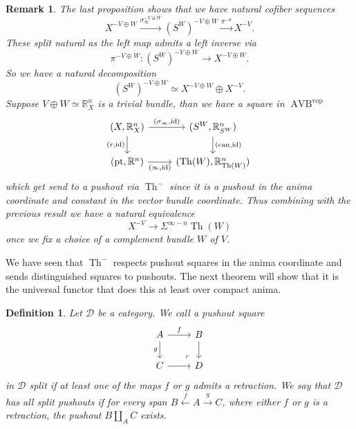 \documentclass{article}
\newcommand{\xto}{\xrightarrow}
\newcommand{\xot}{\xleftarrow}
\newcommand{\R}{\mathbb{R}} %
\newcommand{\cD}{\mathcal{D}}
\newcommand{\pt}{\mathrm{pt}}
\newcommand{\vop}{\mathrm{vop}}
\newcommand{\id}{\mathrm{id}}
\DeclareMathOperator{\AVB}{AVB}
\DeclareMathOperator{\Th}{Th}
\newtheorem{definition}{Definition}
\newtheorem{remark}{Remark}
\begin{document}
\begin{remark} 
    The last proposition shows that we have natural cofiber sequences 
    \[
      X^{-V \oplus W} \xto{ \sigma_\infty^{- V \oplus W}} (S^W)^{-V \oplus W} \xto{\pi^{-\theta}} X^{-V}.
    \]
    These split natural as the left map admits a left inverse via 
    \[
    \pi^{-V\oplus W} \colon (S^W)^{-V \oplus W} \to X^{-V \oplus W}.
    \]
    So we have a natural decomposition 
    \[
        (S^W)^{-V \oplus W} \simeq  X^{-V \oplus W} \oplus X^{-V}.
    \]
    Suppose $V \oplus W \simeq \R^n_X$ is a trivial bundle, than we have a square in $\AVB^\vop$
    \[\begin{tikzcd}
        {(X,\R^n_X)} & {(S^W,\R^n_{S^W})} \\
        {(\pt, \R^n)} & {(\mathrm{Th}(W),\R^n_{\mathrm{Th}(W)})}
        \arrow["{(r,\id)}"', from=1-1, to=2-1]
        \arrow["{(\infty,\id)}"', from=2-1, to=2-2]
        \arrow["{(\sigma_\infty, \id)}", from=1-1, to=1-2]
        \arrow["{(\mathrm{can}, \id)}", from=1-2, to=2-2]
    \end{tikzcd}\]
    which get send to a pushout via $\Th^-$ since it is a pushout in the anima coordinate and constant in the vector bundle coordinate.
    Thus combining with the previous result we have a natural equivalence 
    \[
      X^{-V} \to \Sigma^{\infty - n}\Th(W)  
    \]
    once we fix a choice of a complement bundle $W$ of $V$. 
\end{remark}

We have seen that $\Th^-$ respects pushout squares in the anima coordinate and sends distinguished squares to 
pushouts. The next theorem will show that it is the universal functor that does this at least over compact anima. 

\begin{definition}
    Let $\cD$ be a category. We call a pushout square
    \[\begin{tikzcd}
        A & B \\
        C & D
        \arrow["f", from=1-1, to=1-2]
        \arrow["g"', from=1-1, to=2-1]
        \arrow[from=2-1, to=2-2]
        \arrow[from=1-2, to=2-2]
        \arrow["\lrcorner"{anchor=center, pos=0.125, rotate=180}, draw=none, from=2-2, to=1-1]
    \end{tikzcd}\]
    in $\cD$ \emph{split} if at least one of the maps $f$ or $g$ admits a retraction.
    We say that $\cD$ \emph{has all split pushouts} if for every span $B \xot{f} A \xto{g} C$, where either 
    $f$ or $g$ is a retraction, the pushout $B \coprod_A C$ exists.
\end{definition}
\end{document}
